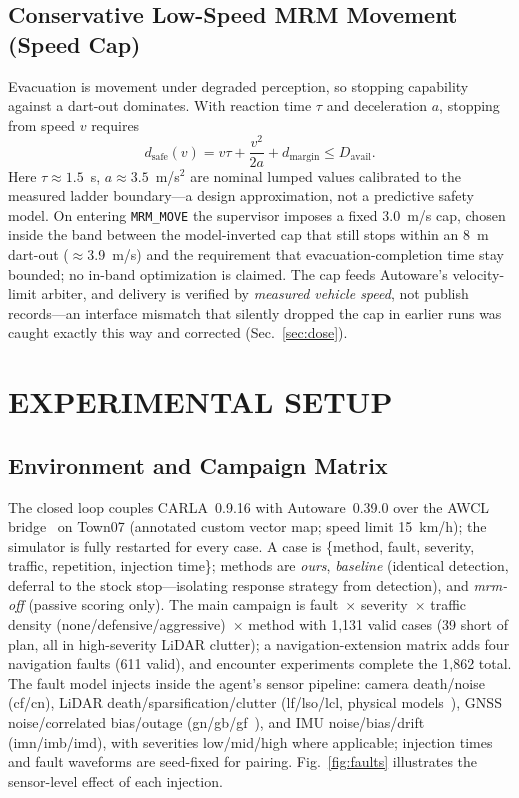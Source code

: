 \documentclass[letterpaper, 10pt, conference]{ieeeconf}
\begin{document}
\subsection{Conservative Low-Speed MRM Movement (Speed Cap)}
Evacuation is movement under degraded perception, so stopping capability
against a dart-out dominates. With reaction time $\tau$ and deceleration
$a$, stopping from speed $v$ requires
\begin{equation}
d_{\mathrm{safe}}(v)=v\tau+\frac{v^2}{2a}+d_{\mathrm{margin}}\le
D_{\mathrm{avail}}.
\label{eq:stop}
\end{equation}
Here $\tau\!\approx\!1.5$~s, $a\!\approx\!3.5$~m/s$^2$ are nominal
lumped values calibrated to the measured ladder boundary---a design
approximation, not a predictive safety model. On entering \texttt{MRM\_MOVE} the supervisor imposes a fixed 3.0~m/s
cap, chosen inside the band between the model-inverted cap that still
stops within an 8~m dart-out ($\approx$3.9~m/s) and the requirement that
evacuation-completion time stay bounded; no in-band optimization is
claimed. The cap feeds Autoware's velocity-limit arbiter, and delivery is
verified by \emph{measured vehicle speed}, not publish records---an
interface mismatch that silently dropped the cap in earlier runs was
caught exactly this way and corrected (Sec.~\ref{sec:dose}).

\section{EXPERIMENTAL SETUP}

\subsection{Environment and Campaign Matrix}
The closed loop couples CARLA~0.9.16 with Autoware~0.39.0 over the AWCL
bridge~\cite{awcl} on Town07 (annotated custom vector map; speed limit
15~km/h); the simulator is fully restarted for every case. A case is \{method, fault, severity, traffic, repetition, injection
time\}; methods are \emph{ours}, \emph{baseline} (identical detection,
deferral to the stock stop---isolating response strategy from detection),
and \emph{mrm-off} (passive scoring only). The main campaign is fault~$\times$ severity~$\times$ traffic density
(none/defensive/aggressive)~$\times$ method with 1{,}131 valid cases (39
short of plan, all in high-severity LiDAR clutter); a navigation-extension
matrix adds four navigation faults (611 valid), and encounter experiments
complete the 1{,}862 total.
The fault model injects inside the agent's sensor pipeline: camera
death/noise (cf/cn), LiDAR death/sparsification/clutter (lf/lso/lcl,
physical models~\cite{trierweiler,goodin}), GNSS noise/correlated
bias/outage (gn/gb/gf~\cite{langel}), and IMU noise/bias/drift (imn/imb/imd),
with severities low/mid/high where applicable; injection times and fault
waveforms are seed-fixed for pairing. Fig.~\ref{fig:faults} illustrates the
sensor-level effect of each injection.
\end{document}
